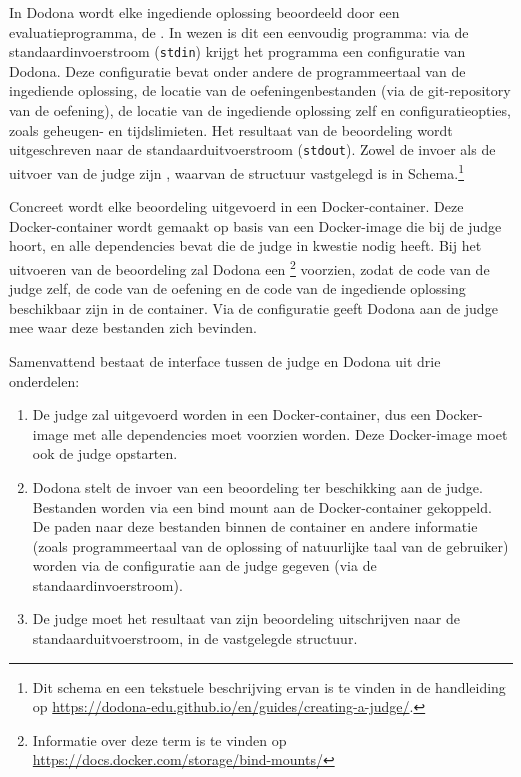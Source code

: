 In Dodona wordt elke ingediende oplossing beoordeeld door een evaluatieprogramma, de .
In wezen is dit een eenvoudig programma: via de standaardinvoerstroom (\texttt{stdin}) krijgt het programma een configuratie van Dodona.
Deze configuratie bevat onder andere de programmeertaal van de ingediende oplossing, de locatie van de oefeningenbestanden (via de git-repository van de oefening), de locatie van de ingediende oplossing zelf en configuratieopties, zoals geheugen- en tijdslimieten.
Het resultaat van de beoordeling wordt uitgeschreven naar de standaarduitvoerstroom (\texttt{stdout}).
Zowel de invoer als de uitvoer van de judge zijn , waarvan de structuur vastgelegd is in  Schema.\footnote{Dit schema en een tekstuele beschrijving ervan is te vinden in de handleiding op \url{https://dodona-edu.github.io/en/guides/creating-a-judge/}.}

Concreet wordt elke beoordeling uitgevoerd in een Docker-container.
Deze Docker-container wordt gemaakt op basis van een Docker-image die bij de judge hoort, en alle dependencies bevat die de judge in kwestie nodig heeft.
Bij het uitvoeren van de beoordeling zal Dodona een \footnote{Informatie over deze term is te vinden op \url{https://docs.docker.com/storage/bind-mounts/}} voorzien, zodat de code van de judge zelf, de code van de oefening en de code van de ingediende oplossing beschikbaar zijn in de container.
Via de configuratie geeft Dodona aan de judge mee waar deze bestanden zich bevinden.

Samenvattend bestaat de interface tussen de judge en Dodona uit drie onderdelen:

\begin{enumerate}
    \item De judge zal uitgevoerd worden in een Docker-container, dus een Docker-image met alle dependencies moet voorzien worden.
    Deze Docker-image moet ook de judge opstarten.
    \item Dodona stelt de invoer van een beoordeling ter beschikking aan de judge.
    Bestanden worden via een bind mount aan de Docker-container gekoppeld.
    De paden naar deze bestanden binnen de container en andere informatie (zoals programmeertaal van de oplossing of natuurlijke taal van de gebruiker) worden via de configuratie aan de judge gegeven (via de standaardinvoerstroom).
    \item De judge moet het resultaat van zijn beoordeling uitschrijven naar de standaarduitvoerstroom, in de vastgelegde structuur.
\end{enumerate}

